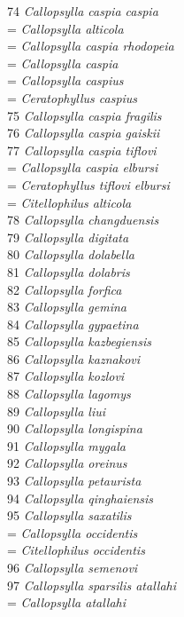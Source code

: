 \documentclass[
]{article}
\begin{document}
74 \emph{Callopsylla caspia caspia}\\
= \emph{Callopsylla alticola}\\
= \emph{Callopsylla caspia rhodopeia}\\
= \emph{Callopsylla caspia}\\
= \emph{Callopsylla caspius}\\
= \emph{Ceratophyllus caspius}\\
75 \emph{Callopsylla caspia fragilis}\\
76 \emph{Callopsylla caspia gaiskii}\\
77 \emph{Callopsylla caspia tiflovi}\\
= \emph{Callopsylla caspia elbursi}\\
= \emph{Ceratophyllus tiflovi elbursi}\\
= \emph{Citellophilus alticola}\\
78 \emph{Callopsylla changduensis}\\
79 \emph{Callopsylla digitata}\\
80 \emph{Callopsylla dolabella}\\
81 \emph{Callopsylla dolabris}\\
82 \emph{Callopsylla forfica}\\
83 \emph{Callopsylla gemina}\\
84 \emph{Callopsylla gypaetina}\\
85 \emph{Callopsylla kazbegiensis}\\
86 \emph{Callopsylla kaznakovi}\\
87 \emph{Callopsylla kozlovi}\\
88 \emph{Callopsylla lagomys}\\
89 \emph{Callopsylla liui}\\
90 \emph{Callopsylla longispina}\\
91 \emph{Callopsylla mygala}\\
92 \emph{Callopsylla oreinus}\\
93 \emph{Callopsylla petaurista}\\
94 \emph{Callopsylla qinghaiensis}\\
95 \emph{Callopsylla saxatilis}\\
= \emph{Callopsylla occidentis}\\
= \emph{Citellophilus occidentis}\\
96 \emph{Callopsylla semenovi}\\
97 \emph{Callopsylla sparsilis atallahi}\\
= \emph{Callopsylla atallahi}\\
\end{document}
